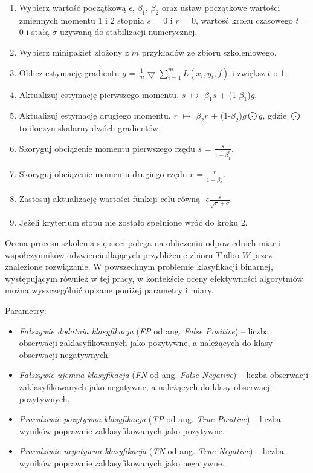 \begin{enumerate}
	\item Wybierz wartość początkową $\epsilon$, $\beta_1$, $\beta_2$ oraz ustaw początkowe wartości zmiennych momentu 1 i 2 stopnia $s$ = 0 i $r$ = 0, wartość kroku czasowego $t$ = 0 i stałą $\sigma$ używaną do stabilizacji numerycznej.
	\item Wybierz minipakiet złożony z $m$ przykładów ze zbioru szkoleniowego.
	\item Oblicz estymację gradientu $g$ = $\frac{1}{m}\bigtriangledown \sum_{i=1}^{m}L(x_i, y_i, f)$ i zwiększ $t$ o 1.
	\item Aktualizuj estymację pierwszego momentu. $s$ $\mapsto$ $\beta_1$$s$ + (1-$\beta_1$)$g$.
	\item Aktualizuj estymację drugiego momentu. $r$ $\mapsto$ $\beta_2$$r$ + (1-$\beta_2$)$g\bigodot g$, gdzie $\bigodot$ to iloczyn skalarny dwóch gradientów.
	\item Skoryguj obciążenie momentu pierwszego rzędu $s$ = $\frac{s}{1-\beta_1^t}$.
	\item Skoryguj obciążenie momentu drugiego rzędu $r$ = $\frac{r}{1-\beta_2^t}$.
	\item Zastosuj aktualizację wartości funkcji celu równą -$\epsilon$$\frac{s}{\sqrt{r}+\sigma}$.
	\item Jeżeli kryterium stopu nie zostało spełnione wróć do kroku 2. 
\end{enumerate}

Ocena procesu szkolenia się sieci polega na obliczeniu odpowiednich miar i współczynników odzwierciedlających przybliżenie zbioru $T$ albo $W$ przez znalezione rozwiązanie. W powszechnym problemie klasyfikacji binarnej, występującym również w tej pracy, w kontekście oceny efektywności algorytmów można wyszczególnić opisane poniżej parametry i miary.

Parametry:
\begin{itemize}[noitemsep,nolistsep]
	\item \textit{Fałszywie dodatnia klasyfikacja} (\textit{FP} od ang. \textit{False Positive}) -- liczba obserwacji zaklasyfikowanych jako pozytywne, a należących do klasy obserwacji negatywnych.
	\item \textit{Fałszywie ujemna klasyfikacja} (\textit{FN} od ang. \textit{False Negative}) -- liczba obserwacji zaklasyfikowanych jako negatywne, a należących do klasy obserwacji pozytywnych. 
	\item \textit{Prawdziwie pozytywna klasyfikacja} (\textit{TP} od ang. \textit{True Positive}) -- liczba wyników poprawnie zaklasyfikowanych jako pozytywne. 
	\item \textit{Prawdziwie negatywna klasyfikacja} (\textit{TN} od ang. \textit{True Negative}) -- liczba wyników poprawnie zaklasyfikowanych jako negatywne.
\end{itemize}

